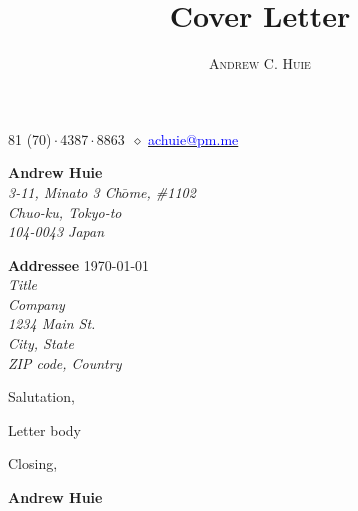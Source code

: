 \documentclass[12pt, a4paper]{article}
\makeatletter
\renewcommand{\maketitle}{
    \begin{center}
        {\Huge\theauthor}

        \vspace{0.25em}

        \raisebox{.3ex}{\footnotesize+}81 (70)\,$\cdot$\,4387\,$\cdot$\,8863~$\diamond$
        \href{mailto:achuie@pm.me}{\textcolor{blue}{
            achuie@pm.me
        }}

    \end{center}
}
\makeatother
\begin{document}
\title{Cover Letter}
\author{\textsc{Andrew C. Huie}}

\maketitle

\vspace{2em}

\begin{flushright}
    {\color{Gray}
    \textbf{Andrew Huie}\\
    \textsl{
        3-11, Minato 3 Ch$\bar{o}$me, \#1102\\
        Chuo-ku, Tokyo-to\\
        104-0043 Japan\\
    }}
\end{flushright}

\vspace{1em}

\textbf{Addressee} \hfill \today\\
\textsl{
    Title\\
    Company\\
    1234 Main St.\\
    City, State\\
    ZIP code, Country\\
}

Salutation,

\vspace{0.75em}

Letter body

\vspace{0.75em}

Closing,

\vspace{2em}

\textbf{Andrew Huie}
\end{document}
